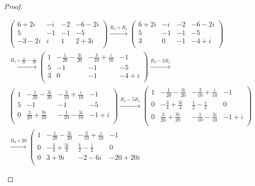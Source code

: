 \begin{proof}
\begin{parts}
			\begin{gather*}
			\left(
\begin{array}{ccc|c}
 6+2 i & -i & -2 & -6-2 i \\
 5 & -1 & -1 & -5 \\
 -3-2 i & i & 1 & 2+3 i \\
\end{array}
\right) \xrightarrow{R_3+R_1} \left(
\begin{array}{ccc|c}
 6+2 i & -i & -2 & -6-2 i \\
 5 & -1 & -1 & -5 \\
 3 & 0 & -1 & -4+i \\
\end{array}
\right) \\\xrightarrow{R_1\times \frac{3}{20}-\frac{i}{20}} \left(
\begin{array}{ccc|c}
 1 & -\frac{1}{20}-\frac{3 i}{20} & -\frac{3}{10}+\frac{i}{10} & -1 \\
 5 & -1 & -1 & -5 \\
 3 & 0 & -1 & -4+i \\
\end{array}
\right) \xrightarrow{R_3-3R_1}\\ \left(
\begin{array}{ccc|c}
 1 & -\frac{1}{20}-\frac{3 i}{20} & -\frac{3}{10}+\frac{i}{10} & -1 \\
 5 & -1 & -1 & -5 \\
 0 & \frac{3}{20}+\frac{9 i}{20} & -\frac{1}{10}-\frac{3 i}{10} & -1+i \\
\end{array}
\right) \xrightarrow{R_2-5R_1} \left(
\begin{array}{ccc|c}
 1 & -\frac{1}{20}-\frac{3 i}{20} & -\frac{3}{10}+\frac{i}{10} & -1 \\
 0 & -\frac{3}{4}+\frac{3 i}{4} & \frac{1}{2}-\frac{i}{2} & 0 \\
 0 & \frac{3}{20}+\frac{9 i}{20} & -\frac{1}{10}-\frac{3 i}{10} & -1+i \\
\end{array}
\right) \\\xrightarrow{R_3\times 20} \left(
\begin{array}{ccc|c}
 1 & -\frac{1}{20}-\frac{3 i}{20} & -\frac{3}{10}+\frac{i}{10} & -1 \\
 0 & -\frac{3}{4}+\frac{3 i}{4} & \frac{1}{2}-\frac{i}{2} & 0 \\
 0 & 3+9 i & -2-6 i & -20+20 i \\
\end{array}

\end{gather*}
\end{parts}
\end{proof}
